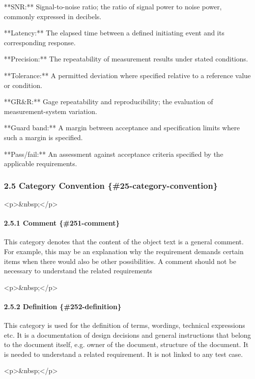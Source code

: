 \documentclass[11pt]{article}
\begin{document}
**SNR:** Signal-to-noise ratio; the ratio of signal power to noise power, commonly expressed in decibels.

**Latency:** The elapsed time between a defined initiating event and its corresponding response.

**Precision:** The repeatability of measurement results under stated conditions.

**Tolerance:** A permitted deviation where specified relative to a reference value or condition.

**GR\&R:** Gage repeatability and reproducibility; the evaluation of measurement-system variation.

**Guard band:** A margin between acceptance and specification limits where such a margin is specified.

**Pass/fail:** An assessment against acceptance criteria specified by the applicable requirements.

\subsubsection{2.5 Category Convention \{\#25-category-convention\}}


<p>\&nbsp;</p>

\paragraph{2.5.1 Comment \{\#251-comment\}}


This category denotes that the content of the object text is a general comment. For example, this may be an explanation why the requirement demands certain items when there would also be other possibilities. A comment should not be necessary to understand the related requirements

<p>\&nbsp;</p>

\paragraph{2.5.2 Definition \{\#252-definition\}}


This category is used for the definition of terms, wordings, technical expressions etc. It is a documentation of design decisions and general instructions that belong to the document itself, e.g. owner of the document, structure of the document. It is needed to understand a related requirement. It is not linked to any test case.

<p>\&nbsp;</p>
\end{document}
